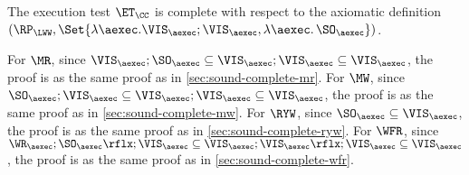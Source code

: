 The execution test $\ET_\CC$ is complete with respect to the axiomatic definition 
\( (\RP_{\LWW}, \Set{\lambda \aexec. \VIS_{\aexec} ; \VIS_{\aexec}, \lambda \aexec \ldotp \SO_\aexec })\).

For \( \MR \), since \(  \VIS_\aexec ; \SO_\aexec \subseteq  \VIS_\aexec ; \VIS_{\aexec} \subseteq \VIS_\aexec \),
the proof is as the same proof as in \cref{sec:sound-complete-mr}.
For \( \MW \), since \( \SO_\aexec ; \VIS_\aexec \subseteq  \VIS_\aexec ; \VIS_{\aexec} \subseteq \VIS_\aexec \),
the proof is as the same proof as in \cref{sec:sound-complete-mw}.
For \( \RYW \), since \( \SO_\aexec \subseteq \VIS_\aexec \),
the proof is as the same proof as in \cref{sec:sound-complete-ryw}.
For \( \WFR \), since \( \WR_\aexec ; \SO_\aexec\rflx ; \VIS_\aexec \subseteq \VIS_\aexec ; \VIS_{\aexec}\rflx ; \VIS_\aexec \subseteq \VIS_\aexec \),
the proof is as the same proof as in \cref{sec:sound-complete-wfr}.
